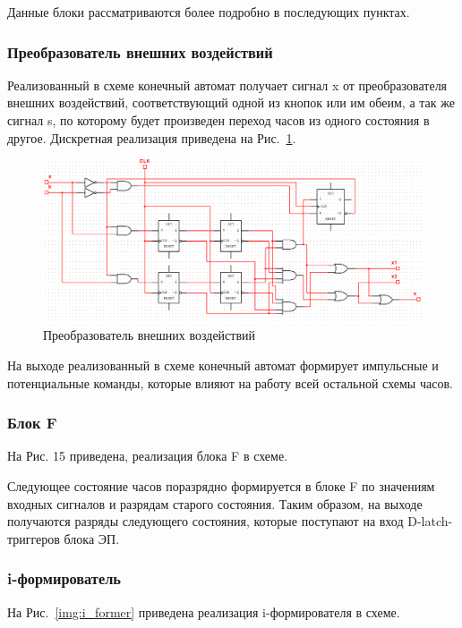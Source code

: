 \documentclass[a4paper, final]{article}
\begin{document}
Данные блоки рассматриваются более подробно в последующих пунктах.

\subsubsection{Преобразователь внешних воздействий}
Реализованный в схеме конечный автомат получает сигнал x от преобразователя внешних воздействий, соответствующий одной из кнопок или им обеим, а так же сигнал s, по которому будет произведен переход часов из одного состояния в другое. Дискретная реализация приведена на Рис.~\ref{img:EIC}. 

\begin{figure}[H]
   \centering
   \includegraphics[width=\linewidth]{EIC.png}
   \caption{Преобразователь внешних воздействий}
   \label{img:EIC}
\end{figure}

На выходе реализованный в схеме конечный автомат формирует импульсные и потенциальные команды, которые влияют на работу всей остальной схемы часов.

\subsubsection{Блок F}
На Рис. 15 приведена, реализация блока F в схеме.

\newpage

\newpage

Следующее состояние часов поразрядно формируется в блоке F по значениям входных сигналов и разрядам старого состояния. Таким образом, на выходе получаются разряды следующего состояния, которые поступают на вход D-latch-триггеров блока ЭП. 

\subsubsection{i-формирователь}
На Рис.~\ref{img:i_former} приведена реализация i-формирователя в схеме.
\end{document}
